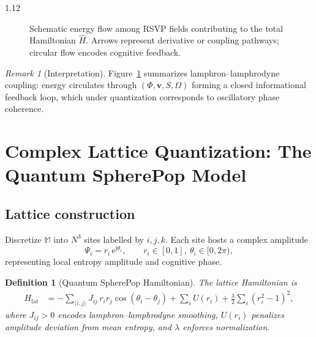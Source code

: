 \documentclass[12pt,a4paper]{article}
\numberwithin{equation}{section}
\newtheorem{definition}{Definition}[section]
\theoremstyle{remark}
\newtheorem{remark}{Remark}[section]
\theoremstyle{definition}
\newcommand{\M}{\mathbb{M}}
\newcommand{\ii}{\mathrm{i}}
\newcommand{\ee}{\mathrm{e}}
\begin{document}
\begin{spacing}{1.12}
\begin{figure}[H]
\caption{Schematic energy flow among RSVP fields contributing to the total Hamiltonian $\hat{H}$. Arrows represent derivative or coupling pathways; circular flow encodes cognitive feedback.}
\label{fig:energy-flow}
\end{figure}

\begin{remark}[Interpretation]
Figure~\ref{fig:energy-flow} summarizes lamphron–lamphrodyne coupling: energy circulates through $(\Phi,\mathbf{v},S,\Omega)$ forming a closed informational feedback loop, which under quantization corresponds to oscillatory phase coherence.
\end{remark}

\section{Complex Lattice Quantization: The Quantum SpherePop Model}
\label{sec:lattice}

\subsection{Lattice construction}
\label{subsec:lattice-construction}

Discretize $\M$ into $N^3$ sites labelled by $i,j,k$.
Each site hosts a complex amplitude
\[
\Psi_{i} = r_i\,\ee^{\ii \theta_i},\qquad r_i\in[0,1],\ \theta_i\in[0,2\pi),
\]
representing local entropy amplitude and cognitive phase.

\begin{definition}[Quantum SpherePop Hamiltonian]
\label{def:lattice-H}
The lattice Hamiltonian is
\begin{align}
H_{\mathrm{lat}}
&= -\sum_{\langle i,j\rangle}
J_{ij}\,r_i r_j \cos(\theta_i-\theta_j)
+\sum_i U(r_i)
+\frac{\lambda}{2}\sum_i (r_i^2-1)^2,
\label{eq:lattice-H}
\end{align}
where $J_{ij}>0$ encodes lamphron--lamphrodyne smoothing,
$U(r_i)$ penalizes amplitude deviation from mean entropy,
and $\lambda$ enforces normalization.
\end{definition}


\end{spacing}
\end{document}
